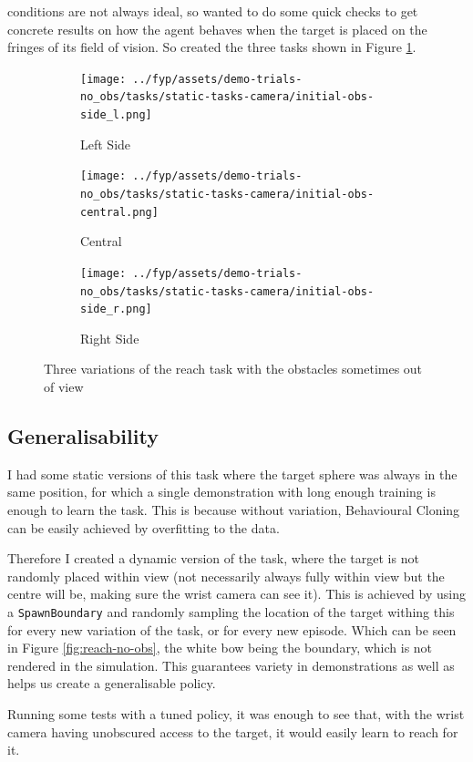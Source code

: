 conditions are not always ideal, so wanted to do some quick checks to get concrete results on how the agent behaves when the target is placed on the fringes of its field of vision. So created the three tasks shown in Figure \ref{fig:no-obs-3-views}.

\begin{figure}[htbp]
  \begin{subfigure}{0.3\linewidth}
    \centering
    \texttt{[image: ../fyp/assets/demo-trials-no\_obs/tasks/static-tasks-camera/initial-obs-side\_l.png]}      
    \caption{Left Side}
  \end{subfigure}
  \hfill
  \begin{subfigure}{0.3\textwidth}
    \centering
    \texttt{[image: ../fyp/assets/demo-trials-no\_obs/tasks/static-tasks-camera/initial-obs-central.png]}
    \caption{Central}
  \end{subfigure}
  \hfill
  \begin{subfigure}{0.3\linewidth}
    \centering
    \texttt{[image: ../fyp/assets/demo-trials-no\_obs/tasks/static-tasks-camera/initial-obs-side\_r.png]}
    \caption{Right Side}
  \end{subfigure}%
  \caption{Three variations of the reach task with the obstacles sometimes out of view}\label{fig:no-obs-3-views}
\end{figure}

\subsection{Generalisability}
I had some static versions of this task where the target sphere was always in the same position, for which a single demonstration with long enough training is enough to learn the task. This is because without variation, Behavioural Cloning can be easily achieved by overfitting to the data. 

Therefore I created a dynamic version of the task, where the target is not randomly placed within view (not necessarily always fully within view but the centre will be, making sure the wrist camera can see it). This is achieved by using a \verb|SpawnBoundary| and randomly sampling the location of the target withing this for every new variation of the task, or for every new episode. Which can be seen in Figure \ref{fig:reach-no-obs}, the white bow being the boundary, which is not rendered in the simulation. This guarantees variety in demonstrations as well as helps us create a generalisable policy.

Running some tests with a tuned  policy, it was enough to see that, with the wrist camera having unobscured access to the target, it would easily learn to reach for it.


